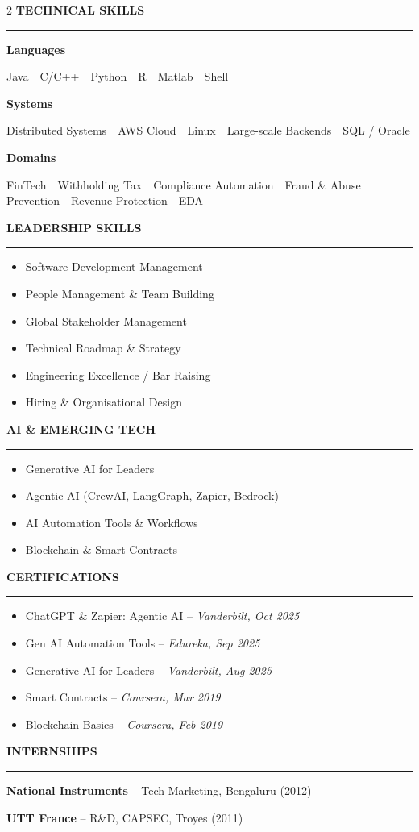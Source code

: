 \documentclass[9pt,a4paper]{extarticle}
\newcommand{\cvsection}[1]{%
  \vspace{4pt}%
  {\small\bfseries\color{textdark}\MakeUppercase{#1}}\par
  \vspace{0pt}%
  {\color{accent}\rule{\linewidth}{0.8pt}}\par
  \vspace{2pt}%
}
\begin{document}
\begin{paracol}{2}
\cvsection{Technical Skills}
\footnotesize
\textbf{Languages}\par
Java~\textperiodcentered~C/C++~\textperiodcentered~Python~\textperiodcentered~R~\textperiodcentered~Matlab~\textperiodcentered~Shell\par\vspace{2pt}
\textbf{Systems}\par
Distributed Systems~\textperiodcentered~AWS Cloud~\textperiodcentered~Linux~\textperiodcentered~Large-scale Backends~\textperiodcentered~SQL / Oracle\par\vspace{2pt}
\textbf{Domains}\par
FinTech~\textperiodcentered~Withholding Tax~\textperiodcentered~Compliance Automation~\textperiodcentered~Fraud \& Abuse Prevention~\textperiodcentered~Revenue Protection~\textperiodcentered~EDA

\cvsection{Leadership Skills}
\footnotesize
\begin{itemize}
  \item Software Development Management
  \item People Management \& Team Building
  \item Global Stakeholder Management
  \item Technical Roadmap \& Strategy
  \item Engineering Excellence / Bar Raising
  \item Hiring \& Organisational Design
\end{itemize}

\cvsection{AI \& Emerging Tech}
\footnotesize
\begin{itemize}
  \item Generative AI for Leaders
  \item Agentic AI (CrewAI, LangGraph, Zapier, Bedrock)
  \item AI Automation Tools \& Workflows
  \item Blockchain \& Smart Contracts
\end{itemize}

\cvsection{Certifications}
\footnotesize
\begin{itemize}
  \item ChatGPT \& Zapier: Agentic AI -- \textit{Vanderbilt, Oct 2025}
  \item Gen AI Automation Tools -- \textit{Edureka, Sep 2025}
  \item Generative AI for Leaders -- \textit{Vanderbilt, Aug 2025}
  \item Smart Contracts -- \textit{Coursera, Mar 2019}
  \item Blockchain Basics -- \textit{Coursera, Feb 2019}
\end{itemize}

\cvsection{Internships}
\footnotesize
\textbf{National Instruments} -- Tech Marketing, Bengaluru (2012)\par\vspace{1pt}
\textbf{UTT France} -- R\&D, CAPSEC, Troyes (2011)

\end{paracol}
\end{document}
